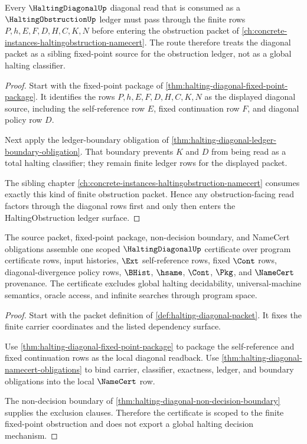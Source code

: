\begin{theorem}\label{thm:halting-diagonal-halting-obstruction-sibling-route}
Every $\HaltingDiagonalUp$ diagonal read that is consumed as a $\HaltingObstructionUp$ ledger must pass through the finite rows $P,h,E,F,D,H,C,K,N$ before entering the obstruction packet of \autoref{ch:concrete-instances-haltingobstruction-namecert}. The route therefore treats the diagonal packet as a sibling fixed-point source for the obstruction ledger, not as a global halting classifier.
\end{theorem}
\begin{proof}
Start with the fixed-point package of \autoref{thm:halting-diagonal-fixed-point-package}. It identifies the rows $P,h,E,F,D,H,C,K,N$ as the displayed diagonal source, including the self-reference row $E$, fixed continuation row $F$, and diagonal policy row $D$.

Next apply the ledger-boundary obligation of \autoref{thm:halting-diagonal-ledger-boundary-obligation}. That boundary prevents $K$ and $D$ from being read as a total halting classifier; they remain finite ledger rows for the displayed packet.

The sibling chapter \autoref{ch:concrete-instances-haltingobstruction-namecert} consumes exactly this kind of finite obstruction packet. Hence any obstruction-facing read factors through the diagonal rows first and only then enters the HaltingObstruction ledger surface.
\end{proof}

\begin{theorem}\label{thm:halting-diagonal-scoped-certificate}
The source packet, fixed-point package, non-decision boundary, and NameCert obligations assemble one scoped $\HaltingDiagonalUp$ certificate over program certificate rows, input histories, $\Ext$ self-reference rows, fixed $\Cont$ rows, diagonal-divergence policy rows, $\BHist$, $\hsame$, $\Cont$, $\Pkg$, and $\NameCert$ provenance. The certificate excludes global halting decidability, universal-machine semantics, oracle access, and infinite searches through program space.
\end{theorem}
\begin{proof}
Start with the packet definition of \autoref{def:halting-diagonal-packet}. It fixes the finite carrier coordinates and the listed dependency surface.

Use \autoref{thm:halting-diagonal-fixed-point-package} to package the self-reference and fixed continuation rows as the local diagonal readback. Use \autoref{thm:halting-diagonal-namecert-obligations} to bind carrier, classifier, exactness, ledger, and boundary obligations into the local $\NameCert$ row.

The non-decision boundary of \autoref{thm:halting-diagonal-non-decision-boundary} supplies the exclusion clauses. Therefore the certificate is scoped to the finite fixed-point obstruction and does not export a global halting decision mechanism.
\end{proof}

